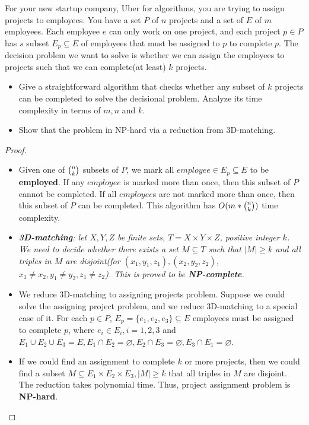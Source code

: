 \documentclass{article}
\newcounter{exercise}
\newcommand{\<}{
    \langle}
\renewcommand{\>}{
    \rangle}
\begin{document}
{\begin{exercise}
For your new startup company, Uber for algorithms, you are trying to assign projects to employees. You have a set $P$ of $n$ projects and a set of $E$ of $m$ employees. Each employee $e$ can only work on one project, and each project $p\in P$ has $s$ subset $E_p\subseteq E$ of employees that must be assigned to $p$ to complete $p$. The decision problem we want to solve is whether we can assign the employees to projects such that we can complete(at least) $k$ projects.
\begin{itemize}
\item Give a straightforward algorithm that checks whether any subset of $k$ projects can be completed to solve the decisional problem. Analyze its time complexity in terms of $m,n$ and $k$.
\item Show that the problem in NP-hard via a reduction from 3D-matching.
\end{itemize}
\end{exercise}
\begin{proof}
    \leavevmode\newline
    \begin{itemize}
        \item Given one of $\tbinom{n}{k}$ subsets of $P$, we mark all $employee\in E_p\subseteq E$ to be \textbf{employed}. If any $employee$ is marked more than once, then this subset of $P$ cannot be completed. If all $employee$s are not marked more than once, then this subset of $P$ can be completed. This algorithm has $O(m*\tbinom{n}{k})$ time complexity.
        \item \textit{\textbf{3D-matching}: let $X,Y,Z$ be finite sets, $T=X\times Y\times Z$, positive integer $k$. We need to decide whether there exists a set $M\subseteq T$ such that $|M|\geq k$ and all triples in $M$ are disjoint(for $(x_1,y_1,z_1),(x_2,y_2,z_2)$, $x_1\neq x_2,y_1\neq y_2,z_1\neq z_2$). This is proved to be \textbf{NP-complete}.}
        \item We reduce 3D-matching to assigning projects problem. Suppose we could solve the assigning project problem, and we reduce 3D-matching to a special case of it. For each $p\in P$, $E_p=\{e_1,e_2,e_3\}\subseteq E$ employees must be assigned to complete $p$, where $e_i\in E_i,i=1,2,3$ and $E_1\cup E_2\cup E_3=E,E_1\cap E_2=\varnothing,E_2\cap E_3=\varnothing,E_3\cap E_1=\varnothing$.
        \item If we could find an assignment to complete $k$ or more projects, then we could find a subset $M\subseteq E_1\times E_2\times E_3,|M|\geq k$ that all triples in $M$ are disjoint. The reduction takes polynomial time. Thus, project assignment problem is \textbf{NP-hard}.
    \end{itemize}
\end{proof}

}
\end{document}
